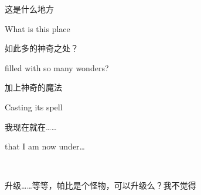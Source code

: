 \begin{song}
这是什么地方

What is this place

\medskip

如此多的神奇之处？

filled with so many wonders?

\medskip

加上神奇的魔法

Casting its spell

\medskip

我现在就在……

that I am now under\dots
\end{song}


~\vfill

\begin{note}
    升级……等等，帕比是个怪物，可以升级么？我不觉得
\end{note}



